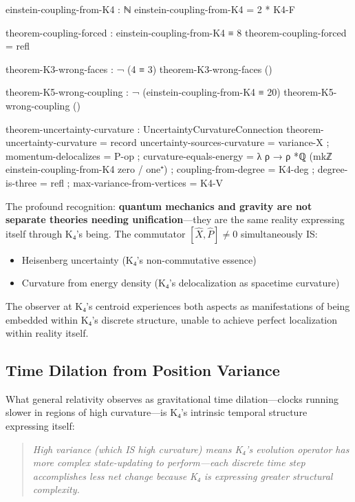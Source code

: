 \documentclass[11pt,a4paper]{book}
\begin{document}
\begin{code}
einstein-coupling-from-K4 : ℕ
einstein-coupling-from-K4 = 2 * K4-F

theorem-coupling-forced : einstein-coupling-from-K4 ≡ 8
theorem-coupling-forced = refl

theorem-K3-wrong-faces : ¬ (4 ≡ 3)
theorem-K3-wrong-faces ()

theorem-K5-wrong-coupling : ¬ (einstein-coupling-from-K4 ≡ 20)
theorem-K5-wrong-coupling ()

theorem-uncertainty-curvature : UncertaintyCurvatureConnection
theorem-uncertainty-curvature = record
  { uncertainty-sources-curvature = variance-X
  ; momentum-delocalizes = P-op
  ; curvature-equals-energy = λ ρ → ρ *ℚ (mkℤ einstein-coupling-from-K4 zero / one⁺)
  ; coupling-from-degree = K4-deg
  ; degree-is-three = refl
  ; max-variance-from-vertices = K4-V
  }
\end{code}

The profound recognition: \textbf{quantum mechanics and gravity are not separate theories needing unification}—they are the same reality expressing itself through K₄'s being. The commutator $[\hat{X},\hat{P}] \neq 0$ simultaneously IS:
\begin{itemize}
\item Heisenberg uncertainty (K₄'s non-commutative essence)
\item Curvature from energy density (K₄'s delocalization as spacetime curvature)
\end{itemize}

The observer at K₄'s centroid experiences both aspects as manifestations of being embedded within K₄'s discrete structure, unable to achieve perfect localization within reality itself.

\subsection{Time Dilation from Position Variance}

What general relativity observes as gravitational time dilation—clocks running slower in regions of high curvature—is K₄'s intrinsic temporal structure expressing itself:
\begin{quote}
\emph{High variance (which IS high curvature) means K₄'s evolution operator has more complex state-updating to perform—each discrete time step accomplishes less net change because K₄ is expressing greater structural complexity.}
\end{quote}
\end{document}
